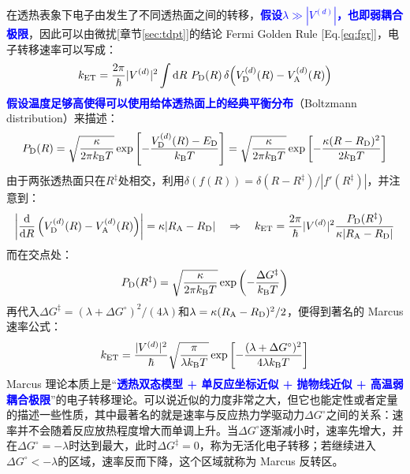 在透热表象下电子由发生了不同透热面之间的转移，\textcolor{blue}{\textbf{假设$\lambda\gg|V^{(d)}|$，也即弱耦合极限}}，因此可以由微扰[章节\ref{sec:tdpt}]的结论 Fermi Golden Rule [Eq.\eqref{eq:fgr}]，电子转移速率可以写成：
\[k_{\rm ET}=\frac{2\pi}{\hbar}|V^{(d)}|^2\int \dd{R}\,P_{\rm D}(R)\,\delta\!\left(V_{\rm D}^{(d)}(R)-V_{\rm A}^{(d)}(R)\right)\]
\textcolor{blue}{\textbf{假设温度足够高使得可以使用给体透热面上的经典平衡分布}}（Boltzmann distribution）来描述：
\[P_{\rm D}(R)=\sqrt{\frac{\kappa}{2\pi k_{\mathrm{B}}T}}\exp\left[-\frac{V_{\rm D}^{(d)}(R)-E_{\rm D}}{k_{\mathrm{B}}T}\right]=\sqrt{\frac{\kappa}{2\pi k_{\mathrm{B}}T}}\exp\left[-\frac{\kappa(R-R_{\rm D})^2}{2k_{\mathrm{B}}T}\right]\]
由于两张透热面只在$R^\ddagger$处相交，利用$\delta(f(R))=\delta(R-R^\ddagger)/|f'(R^\ddagger)|$，并注意到：
\[\left|\dv{}{R}\left(V_{\rm D}^{(d)}(R)-V_{\rm A}^{(d)}(R)\right)\right|=\kappa|R_{\rm A}-R_{\rm D}| \quad \Rightarrow \quad k_{\rm ET}=\frac{2\pi}{\hbar}|V^{(d)}|^2\frac{P_{\rm D}(R^\ddagger)}{\kappa|R_{\rm A}-R_{\rm D}|}\]
而在交点处：
\[P_{\rm D}(R^\ddagger)=\sqrt{\frac{\kappa}{2\pi k_{\mathrm{B}}T}}\exp\left(-\frac{\Delta G^\ddagger}{k_{\mathrm{B}}T}\right)\]
再代入$\Delta G^\ddagger=(\lambda+\Delta G^\circ)^2/(4\lambda)$和$\lambda=\kappa(R_{\rm A}-R_{\rm D})^2/2$，便得到著名的 Marcus 速率公式：
\begin{equation}
k_{\rm ET}=\frac{|V^{(d)}|^2}{\hbar}\sqrt{\frac{\pi}{\lambda k_{\mathrm{B}}T}}
\exp\left[-\frac{(\lambda+\Delta G^\circ)^2}{4\lambda k_{\mathrm{B}}T}\right]
\end{equation}
Marcus 理论本质上是“\textcolor{blue}{\textbf{透热双态模型 + 单反应坐标近似 + 抛物线近似 + 高温弱耦合极限}}”的电子转移理论。可以说近似的力度非常之大，但它也能定性或者定量的描述一些性质，其中最著名的就是速率与反应热力学驱动力$\Delta G^\circ$之间的关系：速率并不会随着反应放热程度增大而单调上升。当$\Delta G^\circ$逐渐减小时，速率先增大，并在$\Delta G^\circ=-\lambda$时达到最大，此时$\Delta G^\ddagger=0$，称为无活化电子转移；若继续进入$\Delta G^\circ<-\lambda$的区域，速率反而下降，这个区域就称为 Marcus 反转区。

